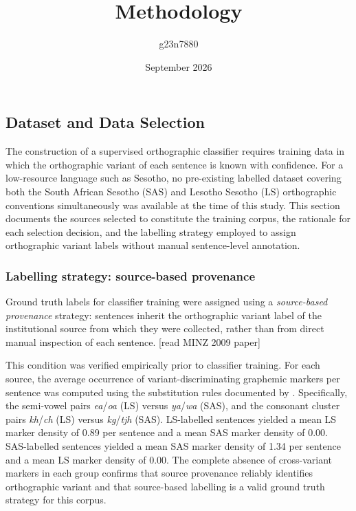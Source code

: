 \documentclass[11pt,a4paper]{article}
\title{Methodology}
\author{g23n7880 }
\date{September 2026}
\begin{document}
\maketitle

\subsection{Dataset and Data Selection}
\label{sec:data_selection}

The construction of a supervised orthographic classifier requires training data in
which the orthographic variant of each sentence is known with confidence. For a
low-resource language such as Sesotho, no pre-existing labelled dataset covering
both the South African Sesotho (SAS) and Lesotho Sesotho (LS) orthographic
conventions simultaneously was available at the time of this study. This section
documents the sources selected to constitute the training corpus, the rationale
for each selection decision, and the labelling strategy employed to assign
orthographic variant labels without manual sentence-level annotation.

\subsubsection{Labelling strategy: source-based provenance}

Ground truth labels for classifier training were assigned using a
\textit{source-based provenance} strategy: sentences inherit the orthographic
variant label of the institutional source from which they were collected, rather
than from direct manual inspection of each sentence. [read MINZ 2009 paper]

This condition was verified empirically prior to classifier training. For each
source, the average occurrence of variant-discriminating graphemic markers
per sentence was computed using the substitution rules documented by
\citet{makutoane2022people}. Specifically, the semi-vowel pairs
\textit{ea}/\textit{oa} (LS) versus \textit{ya}/\textit{wa} (SAS), and
the consonant cluster pairs \textit{kh}/\textit{ch} (LS) versus
\textit{kg}/\textit{tjh} (SAS). LS-labelled sentences yielded a mean LS
marker density of 0.89 per sentence and a mean SAS marker density of 0.00.
SAS-labelled sentences yielded a mean SAS marker density of 1.34 per sentence
and a mean LS marker density of 0.00. The complete absence of cross-variant
markers in each group confirms that source provenance reliably identifies
orthographic variant and that source-based labelling is a valid ground truth
strategy for this corpus.
\end{document}
